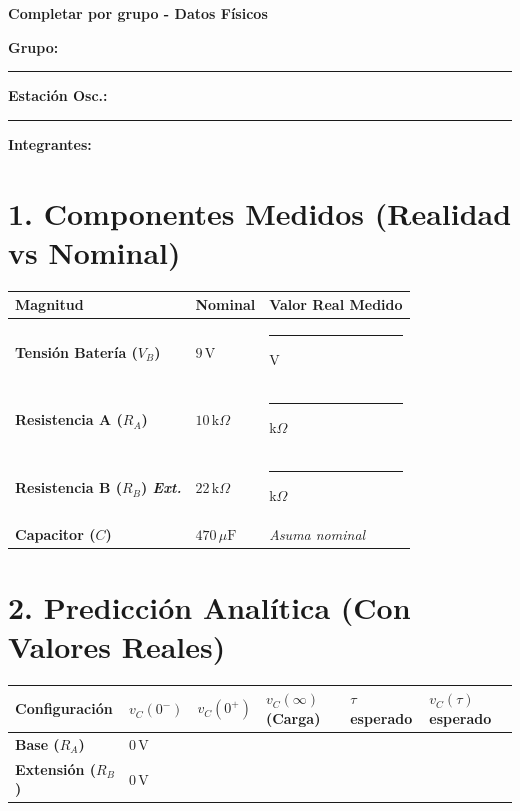 \documentclass[11pt, a4paper]{article}
\begin{document}
\begin{tcolorbox}[colback=ucbblue!5!white, colframe=ucbblue, title=\textbf{Hoja de Trabajo y Registro de Datos — Laboratorio RC}]
    \centering \textbf{Completar por grupo - Datos Físicos}
\end{tcolorbox}

\textbf{Grupo:} \rule{2cm}{0.4pt} \quad \textbf{Estación Osc.:} \rule{2cm}{0.4pt} \quad \textbf{Integrantes:} \hrulefill

\section*{1. Componentes Medidos (Realidad vs Nominal)}
\renewcommand{\arraystretch}{1.4}
\noindent
\begin{tabularx}{\textwidth}{>{\bfseries}p{4cm} >{\centering\arraybackslash}p{3cm} >{\centering\arraybackslash}X}
\toprule
\textbf{Magnitud} & \textbf{Nominal} & \textbf{Valor Real Medido} \\ 
\midrule
Tensión Batería ($V_B$) & $9\,\text{V}$ & \rule{3cm}{0.4pt} V \\ \addlinespace
Resistencia A ($R_A$) & $10\,\text{k}\Omega$ & \rule{3cm}{0.4pt} k$\Omega$ \\ \addlinespace
Resistencia B ($R_B$) \textit{Ext.} & $22\,\text{k}\Omega$ & \rule{3cm}{0.4pt} k$\Omega$ \\ \addlinespace
Capacitor ($C$) & $470\,\mu\text{F}$ & \textit{Asuma nominal} \\ 
\bottomrule
\end{tabularx}

\section*{2. Predicción Analítica (Con Valores Reales)}
\renewcommand{\arraystretch}{1.5}
\noindent
\begin{tabularx}{\textwidth}{>{\centering\arraybackslash}p{2.5cm} >{\centering\arraybackslash}X >{\centering\arraybackslash}X >{\centering\arraybackslash}X >{\centering\arraybackslash}X >{\centering\arraybackslash}X}
\toprule
\textbf{Configuración} & \textbf{$v_C(0^-)$} & \textbf{$v_C(0^+)$} & \textbf{$v_C(\infty)$ (Carga)} & \textbf{$\tau$ esperado} & \textbf{$v_C(\tau)$ esperado} \\ 
\midrule
\textbf{Base ($R_A$)} & $0\,\text{V}$ & & & & \\ \addlinespace
\textbf{Extensión ($R_B$)} & $0\,\text{V}$ & & & & \\
\bottomrule
\end{tabularx}
\end{document}
